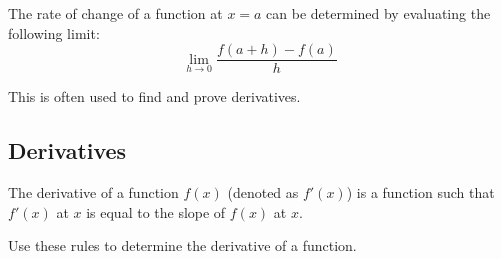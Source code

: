 \documentclass{article}
\begin{document}
The rate of change of a function at $x = a$ can be determined by evaluating the following limit: 
\begin{equation}\lim_ {h \to 0} \frac{f(a+h) - f(a)}{h}\end{equation}

This is often used to find and prove derivatives. 


\subsection{Derivatives}

The derivative of a function $f(x)$ (denoted as $f'(x)$) is a function such that $f'(x)$ at $x$ is equal to the slope of $f(x)$ at $x$. 

Use these rules to determine the derivative of a function. 
\end{document}

